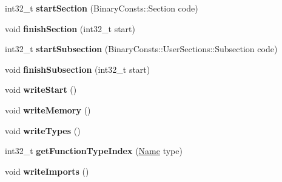 \begin{DoxyCompactItemize}
\item 
\mbox{\label{classwasm_1_1_wasm_binary_writer_af351f561db59006e5df20c9daa38c56f}} 
int32\+\_\+t {\bfseries start\+Section} (Binary\+Consts\+::\+Section code)
\item 
\mbox{\label{classwasm_1_1_wasm_binary_writer_a3a1810359f401518c3f2f0e9f48cf949}} 
void {\bfseries finish\+Section} (int32\+\_\+t start)
\item 
\mbox{\label{classwasm_1_1_wasm_binary_writer_a21a5905ad051c7f2f91fc7327b51d7f4}} 
int32\+\_\+t {\bfseries start\+Subsection} (Binary\+Consts\+::\+User\+Sections\+::\+Subsection code)
\item 
\mbox{\label{classwasm_1_1_wasm_binary_writer_ae3fe1bf5f50da609e8df354a9e2a6bb9}} 
void {\bfseries finish\+Subsection} (int32\+\_\+t start)
\item 
\mbox{\label{classwasm_1_1_wasm_binary_writer_a2b5d4fe429edf47828203f4da032e2e5}} 
void {\bfseries write\+Start} ()
\item 
\mbox{\label{classwasm_1_1_wasm_binary_writer_a3b379f370d2323c5ae68095a51f40339}} 
void {\bfseries write\+Memory} ()
\item 
\mbox{\label{classwasm_1_1_wasm_binary_writer_a74b89ec1fdf43b0084fa951c8d7f9a32}} 
void {\bfseries write\+Types} ()
\item 
\mbox{\label{classwasm_1_1_wasm_binary_writer_a0eaad27cdd7c467bc9efe54ad4e0adea}} 
int32\+\_\+t {\bfseries get\+Function\+Type\+Index} (\mbox{\hyperlink{structwasm_1_1_name}{Name}} type)
\item 
\mbox{\label{classwasm_1_1_wasm_binary_writer_ae200bf0690b9f1900e754b9308e6c1f1}} 
void {\bfseries write\+Imports} ()
\item 
\mbox{\label{classwasm_1_1_wasm_binary_writer_a1e8cc5fdb76f78cd885a54e114cff9e5}} 

\end{DoxyCompactItemize}
